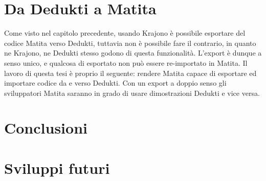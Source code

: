 \documentclass[12pt,a4paper]{report}
\begin{document}


\chapter{Da Dedukti a Matita}
Come visto nel capitolo precedente, usando Krajono è possibile esportare 
del codice Matita verso Dedukti, tuttavia non è possibile fare il contrario,
in quanto ne Krajono, ne Dedukti stesso godono di questa funzionalità.
L'export è dunque a senso unico, e qualcosa di esportato non può essere
re-importato in Matita. Il lavoro di questa tesi è proprio il seguente:
rendere Matita capace di esportare ed importare codice da e verso Dedukti.
Con un export a doppio senso gli sviluppatori Matita saranno in grado 
di usare dimostrazioni Dedukti e vice versa.



\chapter{Conclusioni}

\chapter{Sviluppi futuri}
\end{document}
